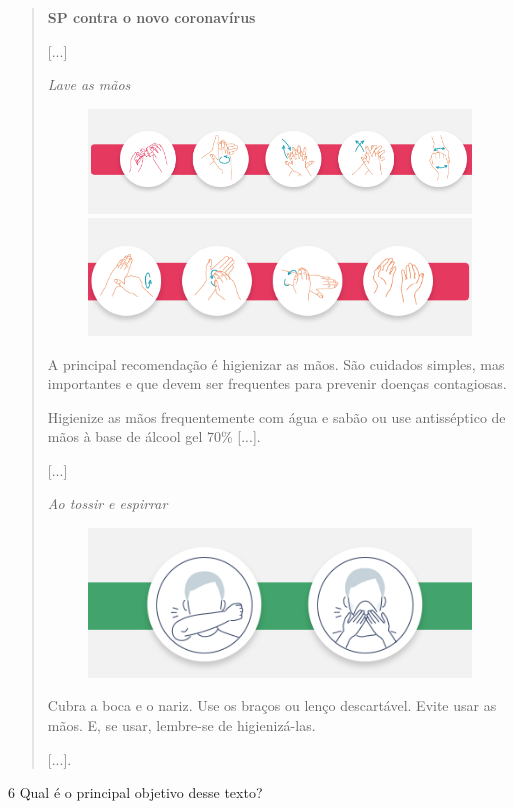 \begin{quote}
\textbf{SP contra o novo coronavírus}

{[}...{]}

\textit{Lave as mãos}

\begin{figure}[htpb!]
\includegraphics[width=.5\textwidth]{./imgs/img12.png}
\includegraphics[width=.5\textwidth]{./imgs/img13.png}
\end{figure}

A principal recomendação é higienizar as mãos. São cuidados simples,
mas importantes e que devem ser frequentes para prevenir doenças
contagiosas.

Higienize as mãos frequentemente com água e sabão ou use antisséptico de
mãos à base de álcool gel 70\% {[}...{]}.

{[}...{]}

\textit{Ao tossir e espirrar}

\begin{figure}[htpb!]
\includegraphics[width=.5\textwidth]{./imgs/img14.png}
\end{figure}

Cubra a boca e o nariz. Use os braços ou lenço descartável. Evite usar
as mãos. E, se usar, lembre-se de higienizá-las.

{[}...{]}.

\end{quote}

\num{6} Qual é o principal objetivo desse texto?



